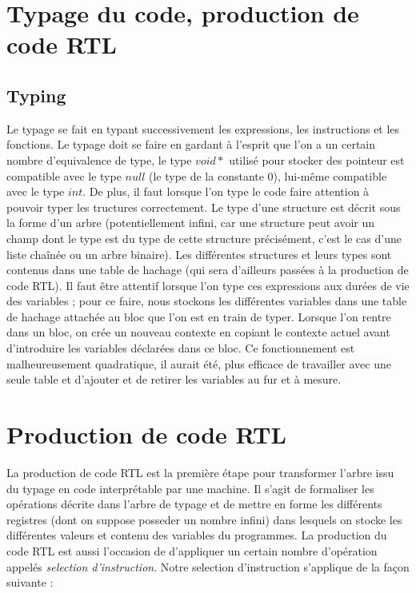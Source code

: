 \section{Typage du code, production de code RTL}
\subsection{Typing}

Le typage se fait en typant successivement les expressions, les instructions et les fonctions. Le typage doit se faire en gardant \`a l'esprit que l'on a un certain nombre d'equivalence de type, le type $void*$ utilis\'e pour stocker des pointeur est compatible avec le type $null$ (le type de la constante $0$), lui-m\^eme compatible avec le type $int$. De plus, il faut lorsque l'on type le code faire attention \`a pouvoir typer les tructures correctement. Le type d'une structure est d\'ecrit sous la forme d'un arbre (potentiellement infini, car une structure peut avoir un champ dont le type est du type de cette structure pr\'ecis\'ement, c'est le cas d'une liste cha\^in\'ee ou un arbre binaire). Les diff\'erentes structures et leurs types sont contenus dans une table de hachage (qui sera d'ailleurs pass\'ees \`a la production de code RTL).
Il faut \^etre attentif lorsque l'on type ces expressions aux dur\'ees de vie des variables ; pour ce faire, nous stockons les diff\'erentes variables dans une table de hachage attach\'ee au bloc que l'on est en train de typer. Lorsque l'on rentre dans un bloc, on cr\'ee un nouveau contexte en copiant le contexte actuel avant d'introduire les variables d\'eclar\'ees dans ce bloc. Ce fonctionnement est malheureusement quadratique, il aurait \'et\'e, plus efficace de travailler avec une seule table et d'ajouter et de retirer les variables au fur et \`a mesure.

\section{Production de code RTL}

La production de code RTL est la premi\`ere \'etape pour transformer l'arbre issu du typage en code interpr\'etable par une machine. Il s'agit de formaliser les op\'erations d\'ecrite dans l'arbre de typage et de mettre en forme les diff\'erents registres (dont on suppose posseder un nombre infini) dans lesquels on stocke les diff\'erentes valeurs et contenu des variables du programmes. La production du code RTL est aussi l'occasion de d'appliquer un certain nombre d'op\'eration appel\'es \emph{selection d'instruction}. Notre selection d'instruction s'applique de la fa\c con suivante :

